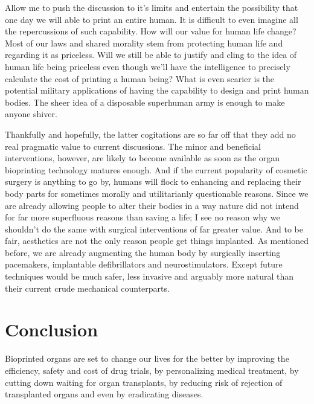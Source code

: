 \documentclass[12pt]{article} %
\begin{document}
Allow me to push the discussion to it's limits and entertain the possibility that one day we will able to print an entire human. It is difficult to even imagine all the repercussions of such capability. How will our value for human life change? Most of our laws and shared morality stem from protecting human life and regarding it as priceless. Will we still be able to justify and cling to the idea of human life being priceless even though we'll have the intelligence to precisely calculate the cost of printing a human being? What is even scarier is the potential military applications of having the capability to design and print human bodies. The sheer idea of a disposable superhuman army is enough to make anyone shiver.
 
Thankfully and hopefully, the latter cogitations are so far off that they add no real pragmatic value to current discussions. 
The minor and beneficial interventions, however, are likely to become available as soon as the organ bioprinting technology matures enough. And if the current popularity of cosmetic surgery is anything to go by, humans will flock to enhancing and replacing their body parts for sometimes morally and utilitarianly questionable reasons. Since we are already allowing people to alter their bodies in a way nature did not intend for far more superfluous reasons than saving a life; I see no reason why we shouldn't do the same with surgical interventions of far greater value. And to be fair, aesthetics are not the only reason people get things implanted. As mentioned before, we are already augmenting the human body by surgically inserting pacemakers, implantable defibrillators and neurostimulators. Except future techniques would be much safer, less invasive and arguably more natural than their current crude mechanical counterparts.

\newpage 

\section{Conclusion} %

Bioprinted organs are set to change our lives for the better by improving the efficiency, safety and cost of drug trials, by personalizing medical treatment, by cutting down waiting for organ transplants, by reducing risk of rejection of transplanted organs and even by eradicating diseases.  
\end{document}
